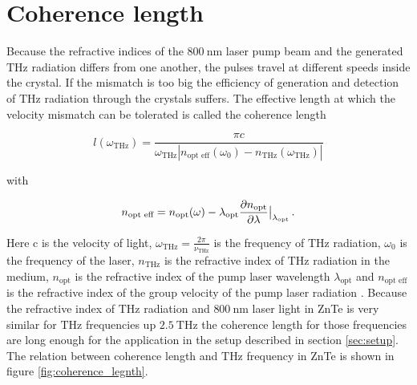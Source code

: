 \section{Coherence length}
Because the refractive indices of the $\SI{800}{\nano\meter}$ laser pump beam and the generated $\si{\tera\hertz}$ radiation differs from one another, the pulses travel at different speeds inside the crystal.
If the mismatch is too big the efficiency of generation and detection of $\si{\tera\hertz}$ radiation through the crystals suffers.
The effective length at which the velocity mismatch can be tolerated is called the coherence length

\begin{equation}
    l(\omega_{\si{\tera\hertz}}) = \frac{\pi c}{\omega_{\si{\tera\hertz}} \left | n_\text{opt eff}(\omega_0) - n_{\si{\tera\hertz}}(\omega_{\si{\tera\hertz}})\right |}
\end{equation}

with 

\begin{equation}
    n_{\text{opt eff}} = n_\text{opt}(\omega) - \lambda_\text{opt}\frac{\partial n_\text{opt}}{\partial \lambda}\big{|}_{\lambda_\text{opt}} \, .  
\end{equation}

Here c is the velocity of light, $\omega_{\si{\tera\hertz}} = \frac{2\pi}{\nu_{\si{\tera\hertz}}}$ is the frequency of $\si{\tera\hertz}$ radiation, $\omega_0$ is the frequency of the laser, $n_{\si{\tera\hertz}}$ is the refractive index of $\si{\tera\hertz}$ radiation in the medium, $n_\text{opt}$ is the refractive index of the pump laser wavelength $\lambda_\text{opt}$ and $n_\text{opt eff}$ is the refractive index of the group velocity of the pump laser radiation \cite{coherence_legnth}.
Because the refractive index of $\si{\tera\hertz}$ radiation and $\SI{800}{\nano\meter}$ laser light in ZnTe is very similar for $\si{\tera\hertz}$ frequencies up $\SI{2.5}{\tera\hertz}$ \cite{coherence_legnth} the coherence length for those frequencies are long enough for the application in the setup described in section \ref{sec:setup}.
The relation between coherence length and $\si{\tera\hertz}$ frequency in ZnTe is shown in figure \ref{fig:coherence_legnth}.

